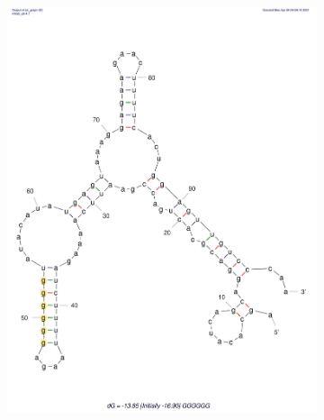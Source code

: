 \begin{figure}[!ht]
    \centering
    \begin{subfigure}[b]{0.49\textwidth}
        \centering
        \includegraphics[scale=0.25]{plots/Supplementary/Structure_GGGGGG.pdf}
        \label{fig:GGGGGG}
    \end{subfigure}
    \hfill
    \begin{subfigure}[b]{0.49\textwidth}
        \centering

\end{subfigure}
\end{figure}
